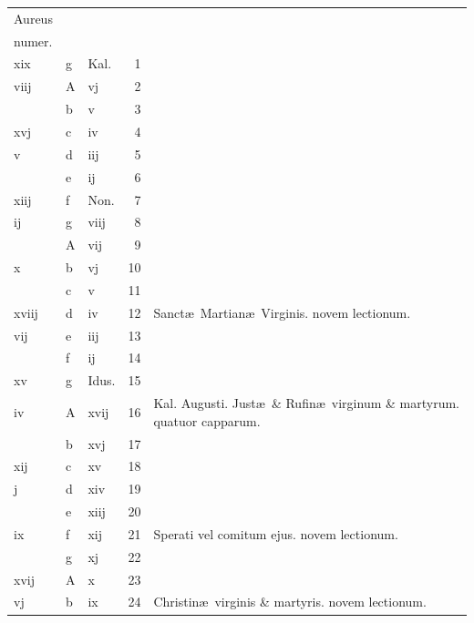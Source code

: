 \documentclass[letter,11pt]{book}
\begin{document}
\begin{center}
\begin{tabular}{l | l | l | r | l}
\color{Red}Aureus & & & \\
\color{Red}numer. & & & \\
\color{Red} xix & g & \color{Red} Kal. & 1 & \\
\color{Red} viij & \color{Red} A & \color{Red} vj & 2 & \\
\color{Red}  & b & \color{Red} v & 3 & \\
\color{Red} xvj & c & \color{Red} iv & 4 & \\
\color{Red} v & d & \color{Red} iij & 5 & \\
\color{Red}  & e & \color{Red} ij & 6 & \\
\color{Red} xiij & f & Non. & 7 & \\
\color{Red} ij & g & \color{Red} viij & 8 & \\
\color{Red}  & \color{Red} A & \color{Red} vij & 9 & \\
\color{Red} x & b & \color{Red} vj & 10 & \\
\color{Red}  & c & \color{Red} v & 11 & \\
\color{Red} xviij & d & \color{Red} iv & 12 & Sanct\ae \ Martian\ae \ Virginis. \color{Red} novem lectionum. \\
\color{Red} vij & e & \color{Red} iij & 13 & \\
\color{Red}  & f & \color{Red} ij & 14 & \\
\color{Red} xv & g & Idus. & 15 & \\
\color{Red} iv & \color{Red} A & \color{Red} xvij & 16 & \color{Red} Kal. Augusti. \color{black} Just\ae \ \& Rufin\ae \ virginum \& martyrum. \color{Red} quatuor capparum. \\
\color{Red}  & b & \color{Red} xvj & 17 & \\
\color{Red} xij & c & \color{Red} xv & 18 \\
\color{Red} j & d & \color{Red} xiv & 19 & \\
\color{Red}  & e & \color{Red} xiij & 20 & \\
\color{Red} ix & f & \color{Red} xij & 21 & Sperati vel comitum ejus. \color{Red} novem lectionum. \\
\color{Red}  & g & \color{Red} xj & 22 & \\
\color{Red} xvij & \color{Red} A & \color{Red} x & 23 & \\
\color{Red} vj & b & \color{Red} ix & 24 & Christin\ae \ virginis \& martyris. \color{Red} novem lectionum. \\

\end{tabular}
\end{center}
\end{document}
